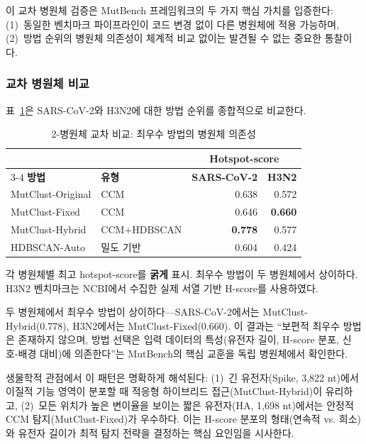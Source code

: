 이 교차 병원체 검증은 MutBench 프레임워크의 두 가지 핵심 가치를 입증한다:
(1)~동일한 벤치마크 파이프라인이 코드 변경 없이 다른 병원체에 적용 가능하며,
(2)~방법 순위의 병원체 의존성이 체계적 비교 없이는 발견될 수 없는 중요한 통찰이다.

\subsubsection{교차 병원체 비교}

표~\ref{tab:cross_pathogen}은 SARS-CoV-2와 H3N2에 대한 방법 순위를 종합적으로 비교한다.

\begin{table}[htbp]
\centering
\caption{2-병원체 교차 비교: 최우수 방법의 병원체 의존성}
\label{tab:cross_pathogen}
\small
\begin{tabular}{llrr}
\toprule
& & \multicolumn{2}{c}{\textbf{Hotspot-score}} \\
\cmidrule(lr){3-4}
\textbf{방법} & \textbf{유형} & \textbf{SARS-CoV-2} & \textbf{H3N2} \\
\midrule
MutClust-Original & CCM & 0.638 & 0.572 \\
MutClust-Fixed & CCM & 0.646 & \textbf{0.660} \\
MutClust-Hybrid & CCM+HDBSCAN & \textbf{0.778} & 0.577 \\
HDBSCAN-Auto & 밀도 기반 & 0.604 & 0.424 \\
\bottomrule
\end{tabular}
\begin{minipage}{\textwidth}
\smallskip
\footnotesize 각 병원체별 최고 hotspot-score를 \textbf{굵게} 표시. 최우수 방법이 두 병원체에서 상이하다. H3N2 벤치마크는 NCBI에서 수집한 실제 서열 기반 H-score를 사용하였다.
\end{minipage}
\end{table}

두 병원체에서 최우수 방법이 상이하다---SARS-CoV-2에서는 MutClust-Hybrid(0.778), H3N2에서는 MutClust-Fixed(0.660).
이 결과는 ``보편적 최우수 방법은 존재하지 않으며, 방법 선택은 입력 데이터의 특성(유전자 길이, H-score 분포, 신호-배경 대비)에 의존한다''는 MutBench의 핵심 교훈을 독립 병원체에서 확인한다.

생물학적 관점에서 이 패턴은 명확하게 해석된다: (1)~긴 유전자(Spike, 3,822 nt)에서 이질적 기능 영역이 분포할 때 적응형 하이브리드 접근(MutClust-Hybrid)이 유리하고, (2)~모든 위치가 높은 변이율을 보이는 짧은 유전자(HA, 1,698 nt)에서는 안정적 CCM 탐지(MutClust-Fixed)가 우수하다.
이는 H-score 분포의 형태(연속적 vs. 희소)와 유전자 길이가 최적 탐지 전략을 결정하는 핵심 요인임을 시사한다.


